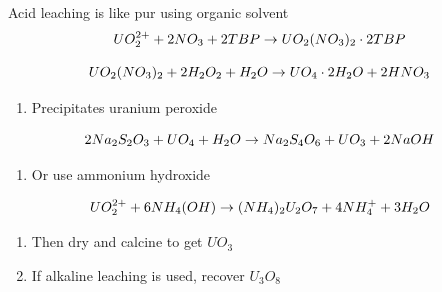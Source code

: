 \documentclass[aspectratio=1610,pdftex,dvipsnames,compress,xcolor={dvipsnames}]{beamer}
\newcommand{\acs}{\acrshort} %
\begin{document}
\begin{frame}{Acid leaching is like \acs{pur} using organic solvent}
    \begin{equation}
        \LARGE
        UO_2^{2+} + 2NO_3 + 2TBP \rightarrow UO_2(NO_3)_2 \cdot 2TBP
    \end{equation}
    
    \begin{equation}
        \LARGE
        UO_2(NO_3)_2 + 2H_2O_2 + H_2O \rightarrow UO_4 \cdot 2H_2O + 2HNO_3
    \end{equation}

    \vspace*{\fill}

    \begin{enumerate}[topsep=0pt,itemsep=18pt,leftmargin=*,label=(\arabic*)]
        \item[]Precipitates uranium peroxide
    \end{enumerate}

    \vspace*{\fill}

    \begin{equation}
        \LARGE
        2Na_2S_2O_3 + UO_4 + H_2O \rightarrow Na_2S_4O_6 + UO_3 + 2NaOH
    \end{equation}
    
    \vspace*{\fill}

    \begin{enumerate}[topsep=0pt,itemsep=18pt,leftmargin=*,label=(\arabic*)]
        \item[]Or use ammonium hydroxide
    \end{enumerate}

    \vspace*{\fill}

    \begin{equation}
        \LARGE
        UO_2^{2+} + 6NH_4(OH) \rightarrow (NH_4)_2U_2O_7 + 4NH_4^+ + 3H_2O
    \end{equation}

    \vspace*{\fill}

    \begin{enumerate}[topsep=0pt,itemsep=11pt,leftmargin=*,label=(\arabic*)]
        \item[]Then dry and calcine to get $UO_3$
        \item[]If alkaline leaching is used, recover $U_3O_8$
    \end{enumerate}
\end{frame}
\end{document}
